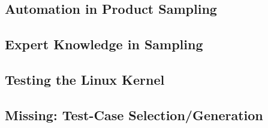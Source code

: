 \subsection{Automation in Product Sampling}

\subsection{Expert Knowledge in Sampling}

\subsection{Testing the Linux Kernel}

\subsection{Missing: Test-Case Selection/Generation}

%

\lessonslearned{
	\item \ldots
}{
	\item \ldots
}{
	\ldots
}




